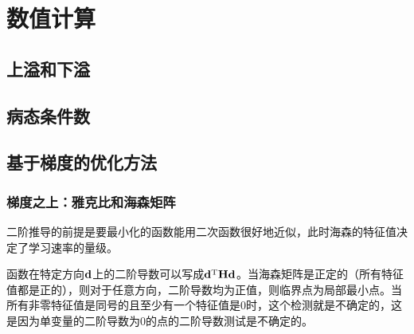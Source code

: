 \chapter{数值计算}
    \section{上溢和下溢}
    \section{病态条件数}
    \section{基于梯度的优化方法}
        \subsection{梯度之上：雅克比和海森矩阵}
            二阶推导的前提是要最小化的函数能用二次函数很好地近似，此时海森的特征值决定了学习速率的量级。
        
            函数在特定方向${\bf{d}}$上的二阶导数可以写成${{\bf{d}}^{\mathop{\rm T}\nolimits} }{\bf{Hd}}$。当海森矩阵是正定的（所有特征值都是正的），则对于任意方向，二阶导数均为正值，则临界点为局部最小点。当所有非零特征值是同号的且至少有一个特征值是0时，这个检测就是不确定的，这是因为单变量的二阶导数为0的点的二阶导数测试是不确定的。
            
            
